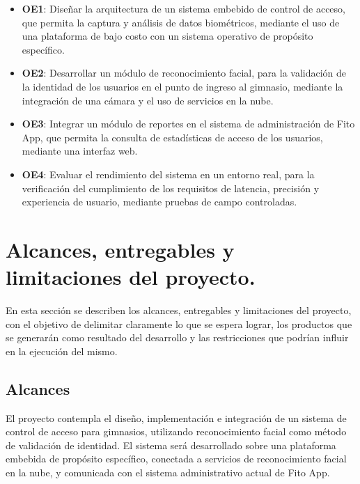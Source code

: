 \newcommand{\objectives}{
    \begin{itemize}
        \item \textbf{OE1}: Diseñar la arquitectura de un sistema embebido de control de acceso, %
        que permita la captura y análisis de datos biométricos, mediante el uso de una plataforma de bajo costo con un sistema operativo de propósito específico.
        
        \item \textbf{OE2}: Desarrollar un módulo de reconocimiento facial, para la validación de la identidad de los usuarios en el punto de ingreso al gimnasio, mediante la integración de una cámara y el uso de servicios en la nube. %
        
        \item \textbf{OE3}: Integrar un módulo de reportes en el sistema de administración de Fito App, %
        que permita la consulta de estadísticas de acceso de los usuarios, mediante %
        una interfaz web.
        
        \item \textbf{OE4}: Evaluar el rendimiento del sistema en un entorno real, para la verificación del cumplimiento de los requisitos de latencia, precisión y experiencia de usuario, mediante pruebas de campo controladas. %

    \end{itemize}
}
\objectives
    
\newpage
\section{Alcances, entregables y limitaciones del proyecto.}
En esta sección se describen los alcances, entregables y limitaciones del proyecto, con el objetivo de delimitar claramente lo que se espera lograr, los productos que se generarán como resultado del desarrollo y las restricciones que podrían influir en la ejecución del mismo.
    
\subsection{Alcances}
El proyecto contempla el diseño, implementación e integración de un sistema de control de acceso para gimnasios, utilizando reconocimiento facial como método de validación de identidad. El sistema será desarrollado sobre una plataforma embebida de propósito específico, conectada a servicios de reconocimiento facial en la nube, y comunicada con el sistema administrativo actual de Fito App.

